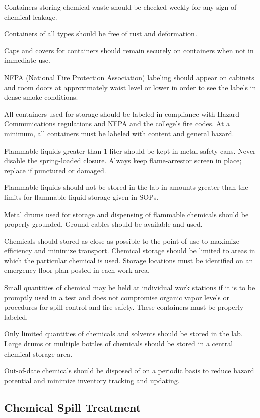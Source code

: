 \documentclass[12pt]{../SOP4_alpha}\usepackage[]{graphicx}\usepackage[]{color}
\begin{document}
\NP Containers storing chemical waste should be checked weekly for any sign of chemical leakage.

\NP Containers of all types should be free of rust and deformation. 

\NP Caps and covers for containers should remain securely on containers when not in immediate use.

\NP NFPA (National Fire Protection Association) labeling should appear on cabinets and room doors at approximately waist level or lower in order to see the labels in dense smoke conditions.

\NP All containers used for storage should be labeled in compliance with Hazard Communications regulations and NFPA and the college's fire codes. At a minimum, all containers must be labeled with content and general hazard.

\NP Flammable liquids greater than 1 liter should be kept in metal safety cans. Never disable the spring-loaded closure. Always keep flame-arrestor screen in place; replace if punctured or damaged. 

\NP Flammable liquids should not be stored in the lab in amounts greater than the limits for flammable liquid storage given in SOPs. 

\NP Metal drums used for storage and dispensing of flammable chemicals should be properly grounded. Ground cables should be available and used.

\NP Chemicals should stored as close as possible to the point of use to maximize efficiency and minimize transport. Chemical storage should be limited to areas in which the particular chemical is used. Storage locations must be identified on an emergency floor plan posted in each work area.

\NP Small quantities of chemical may be held at individual work stations if it is to be promptly used in a test and does not compromise organic vapor levels or procedures for spill control and fire safety. These containers must be properly labeled.

\NP Only limited quantities of chemicals and solvents should be stored in the lab. Large drums or multiple bottles of chemicals should be stored in a central chemical storage area.

\NP Out-of-date chemicals should be disposed of on a periodic basis to reduce hazard potential and minimize inventory tracking and updating.

\subsection*{Chemical Spill Treatment}
\end{document}
